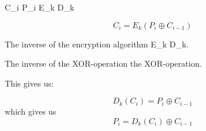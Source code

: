 C_i  \newline
P_i  \newline
E_k  \newline
D_k  \newline

\begin{equation}
C_{i} = E_{k}(P_{i} \oplus C_{i-1})
\end{equation}

The inverse of the encryption algorithm E_{k}  D_{k}.

The inverse of the XOR-operation the XOR-operation.

This gives us:

\begin{equation}
D_{k}(C_{i}) = P_{i} \oplus C_{i-1}
\end{equation}
which gives us
\begin{equation}
P_{i} = D_{k}(C_{i})\oplus C_{i-1}
\end{equation}
